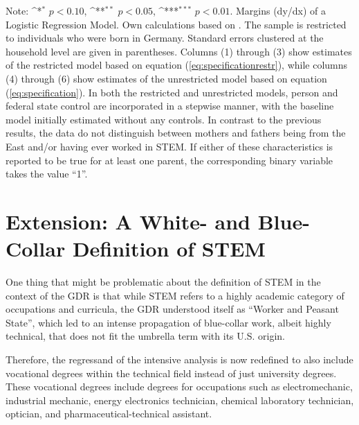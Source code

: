 \documentclass[a4paper, oneside, hyperfootnotes = false]{article}
\def\sym#1{\ifmmode^{#1}\else\(^{#1}\)\fi}
\begin{document}
{\begin{landscape}
\begin{table}[ht]
\begin{center}
			\vspace{2mm}
			
			\parbox{15cm}{
				\linespread{1}\footnotesize Note: \sym{*} \(p<0.10\), \sym{**} \(p<0.05\), \sym{***} \(p<0.01\). Margins (dy/dx) of a Logistic Regression Model. Own calculations based on \cite{SOEP2023}. The sample is restricted to individuals who were born in Germany. Standard errors clustered at the household level are given in parentheses. Columns (1) through (3) show estimates of the restricted model based on equation (\ref{eq:specificationrestr}), while columns (4) through (6) show estimates of the unrestricted model based on equation (\ref{eq:specification}). In both the restricted and unrestricted models, person and federal state control are incorporated in a stepwise manner, with the baseline model initially estimated without any controls. In contrast to the previous results, the data do not distinguish between mothers and fathers being from the East and/or having ever worked in STEM. If either of these characteristics is reported to be true for at least one parent, the corresponding binary variable takes the value ``1''.}
			
		\end{center}
	\end{table}
\end{landscape}

\clearpage

\section{Extension: A White- and Blue-Collar Definition of STEM}
\label{extension}

One thing that might be problematic about the definition of STEM in the context of the GDR is that while STEM refers to a highly academic category of occupations and curricula, the GDR understood itself as ``Worker and Peasant State'', which led to an intense propagation of blue-collar work, albeit highly technical, that does not fit the umbrella term with its U.S. origin.

Therefore, the regressand of the intensive analysis is now redefined to also include vocational degrees within the technical field instead of just university degrees.
These vocational degrees include degrees for occupations such as electromechanic, industrial mechanic, energy electronics technician, chemical laboratory technician, optician, and pharmaceutical-technical assistant.

}
\end{document}
